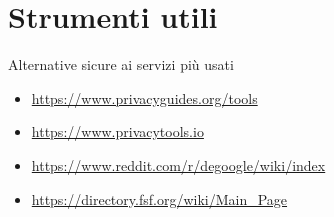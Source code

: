 



\subtitle{Parte 2 - Il mantello dell'invisibilità}
\date{TODO 2022}
\maketitle







\section{Strumenti utili}
\begin{myframe}{Alternative sicure ai servizi più usati}
  \begin{itemize}
    \item \url{https://www.privacyguides.org/tools}
    \item \url{https://www.privacytools.io}
    \item \url{https://www.reddit.com/r/degoogle/wiki/index}
    \item \url{https://directory.fsf.org/wiki/Main_Page}
  \end{itemize}
\end{myframe}


